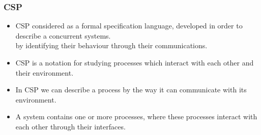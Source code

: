 \documentclass{beamer}
\begin{document}







\begin{frame}
\frametitle {CSP}
\begin{itemize}

\item CSP considered as a formal specification language, developed in order to describe a concurrent systems. \\
{\footnotesize by identifying their behaviour through their communications.}

\item CSP is a notation for studying processes which interact with each other and their environment.

\item In CSP we can describe a process by the way it can communicate with its environment. 


\item A system contains one or more processes, where these processes interact with each other through their interfaces. 

\end{itemize}
\end{frame}






\end{document}
